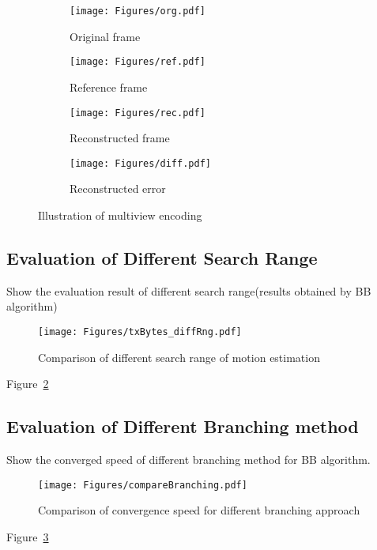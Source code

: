 \begin{figure}
\begin{center}
\begin{subfigure}[b]{0.45\columnwidth}
\texttt{[image: Figures/org.pdf]}
\caption{Original frame}
\end{subfigure}
%
\begin{subfigure}[b]{0.45\columnwidth}
\texttt{[image: Figures/ref.pdf]}
\caption{Reference frame}
\end{subfigure}
%
\begin{subfigure}[b]{0.45\columnwidth}
\texttt{[image: Figures/rec.pdf]}
\caption{Reconstructed frame}
\end{subfigure}
%
\begin{subfigure}[b]{0.45\columnwidth}
\texttt{[image: Figures/diff.pdf]}
\caption{Reconstructed error}
\end{subfigure}
%
\caption{\label{fig::multiViewImageDemo} Illustration of multiview encoding}
\end{center}
\end{figure}
%

\subsection{Evaluation of Different Search Range}
{\color{red}Show the evaluation result of different search range(results obtained by BB algorithm)}
%
\begin{figure}
\begin{center}
\texttt{[image: Figures/txBytes\_diffRng.pdf]}
\caption{\label{fig::txBytes_diffRng} Comparison of different search range of motion estimation}
\end{center}
\end{figure}
Figure~\ref{fig::txBytes_diffRng}

\subsection{Evaluation of Different Branching method}
{\color{red}Show the converged speed of different branching method for BB algorithm.}
\begin{figure}
\begin{center}
\texttt{[image: Figures/compareBranching.pdf]}
\caption{\label{fig::compareBranching} Comparison of convergence speed for different branching approach}
\end{center}
\end{figure}
Figure~\ref{fig::compareBranching}

